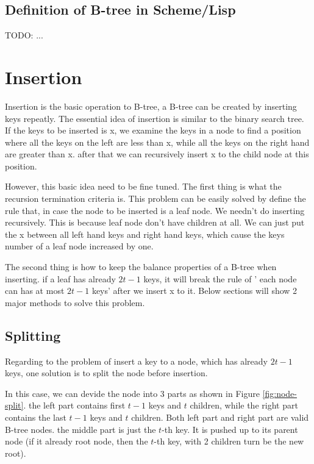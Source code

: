 \documentclass{article}
\begin{document}
\subsection*{Definition of B-tree in Scheme/Lisp}
TODO: ...

\section{Insertion}
\label{btree-insertion}
Insertion is the basic operation to B-tree, a B-tree can be created by inserting
keys repeatly. The essential idea of insertion is similar to the binary
search tree. If the keys to be inserted is x, we examine the keys in a 
node to find a position where all the keys on the left are less than x,
while all the keys on the right hand are greater than x. after that
we can recursively insert x to the child node at this position.

However, this basic idea need to be fine tuned. The first thing is what
the recursion termination criteria is. This problem can be easily solved
by define the rule that, in case the node to be inserted is a leaf node.
We needn't do inserting recursively. This is because leaf node don't have
children at all. We can just put the x between all left hand keys and 
right hand keys, which cause the keys number of a leaf node increased by one.

The second thing is how to keep the balance properties of a B-tree when
inserting. if a leaf has already $2t-1$ keys, it will break the rule of '
each node can has at most $2t-1$ keys' after we insert x to it. Below
sections will show 2 major methods to solve this problem. 

\subsection{Splitting}
\label{split}
Regarding to the problem of insert a key to a node, which has already
$2t-1$ keys, one solution is to split the node before insertion.

In this case, we can devide the node into 3 parts as shown in 
Figure \ref{fig:node-split}. the left part contains first $t-1$ keys
and $t$ children, while the right part contains the last $t-1$ keys
and $t$ children. Both left part and right part are valid B-tree
nodes. the middle part is just the $t$-th key. It is pushed up
to its parent node (if it already root node, then the $t$-th key,
with 2 children turn be the new root).
\end{document}
